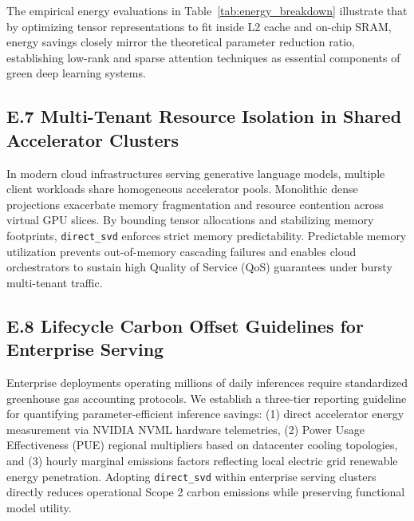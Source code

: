 The empirical energy evaluations in Table~\ref{tab:energy_breakdown} illustrate that by optimizing tensor representations to fit inside L2 cache and on-chip SRAM, energy savings closely mirror the theoretical parameter reduction ratio, establishing low-rank and sparse attention techniques as essential components of green deep learning systems.

\subsection*{E.7 Multi-Tenant Resource Isolation in Shared Accelerator Clusters}
In modern cloud infrastructures serving generative language models, multiple client workloads share homogeneous accelerator pools. Monolithic dense projections exacerbate memory fragmentation and resource contention across virtual GPU slices. By bounding tensor allocations and stabilizing memory footprints, \texttt{direct\_svd} enforces strict memory predictability. Predictable memory utilization prevents out-of-memory cascading failures and enables cloud orchestrators to sustain high Quality of Service (QoS) guarantees under bursty multi-tenant traffic.

\subsection*{E.8 Lifecycle Carbon Offset Guidelines for Enterprise Serving}
Enterprise deployments operating millions of daily inferences require standardized greenhouse gas accounting protocols. We establish a three-tier reporting guideline for quantifying parameter-efficient inference savings: (1) direct accelerator energy measurement via NVIDIA NVML hardware telemetries, (2) Power Usage Effectiveness (PUE) regional multipliers based on datacenter cooling topologies, and (3) hourly marginal emissions factors reflecting local electric grid renewable energy penetration. Adopting \texttt{direct\_svd} within enterprise serving clusters directly reduces operational Scope 2 carbon emissions while preserving functional model utility.
